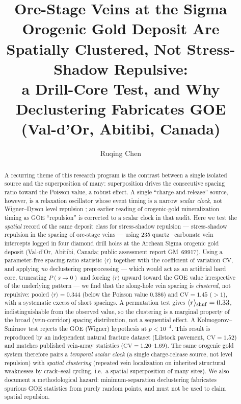 \documentclass[11pt]{article}
\title{\bfseries Ore-Stage Veins at the Sigma Orogenic Gold Deposit Are\\
Spatially Clustered, Not Stress-Shadow Repulsive:\\
a Drill-Core Test, and Why Declustering Fabricates GOE\\
(Val-d'Or, Abitibi, Canada)}
\author[1]{Ruqing Chen}
\affil[1]{GUT Geoservice Inc., Montreal, Quebec, Canada \\ \texttt{ruqing@hotmail.com}}
\date{}
\begin{document}
\maketitle

\begin{abstract}
\noindent
A recurring theme of this research program is the contrast between a single
isolated source and the superposition of many: superposition drives the
consecutive spacing ratio toward the Poisson value, a robust effect. A single
``charge-and-release'' source, however, is a relaxation oscillator whose event
timing is a narrow \emph{scalar clock}, not Wigner--Dyson level repulsion
\citep{chen2026audit}; an earlier reading of orogenic-gold mineralization timing
as GOE ``repulsion'' is corrected to a scalar clock in that audit. Here we test
the \emph{spatial} record of the same deposit class for stress-shadow repulsion ---
stress-shadow repulsion in the spacing of ore-stage veins --- using 235 quartz%
--carbonate vein intercepts logged in four diamond drill holes at the
Archean Sigma orogenic gold deposit (Val-d'Or, Abitibi, Canada; public
assessment report GM~69917). Using a parameter-free spacing-ratio statistic
$\langle r\rangle$ together with the coefficient of variation $\mathrm{CV}$,
and applying \emph{no} declustering preprocessing --- which would act as an
artificial hard core, truncating $P(s\!\to\!0)$ and forcing $\langle r\rangle$
upward toward the GOE value irrespective of the underlying pattern --- we find
that the along-hole
vein spacing is \emph{clustered}, not repulsive: pooled $\langle r\rangle=0.344$
(below the Poisson value $0.386$) and $\mathrm{CV}=1.45$ ($>1$), with a
systematic excess of short spacings. A permutation test gives
$\langle r\rangle_{\rm shuf}=0.33$, indistinguishable from the observed value, so
the clustering is a marginal property of the broad (vein-corridor) spacing
distribution, not a sequential effect. A Kolmogorov--Smirnov test rejects the GOE
(Wigner) hypothesis at $p<10^{-4}$. This result is reproduced by an independent
natural fracture dataset (Lilstock pavement, $\mathrm{CV}=1.52$) and matches
published vein-array statistics ($\mathrm{CV}=1.20$--$1.69$). The same orogenic gold system therefore pairs a \emph{temporal scalar clock} (a
single charge-release source, not level repulsion) with \emph{spatial clustering}
(repeated vein localization on inherited structural weaknesses by crack--seal
cycling, i.e.\ a spatial superposition of many sites). We also document a
methodological hazard:
minimum-separation declustering fabricates spurious GOE statistics from purely
random points, and must not be used to claim spatial repulsion.
\end{abstract}
\end{document}
